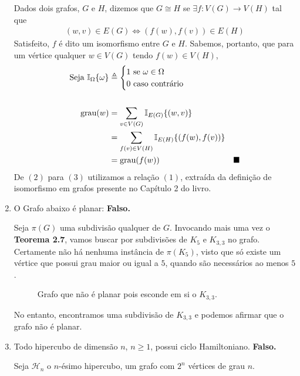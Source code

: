 \documentclass{homework}
\begin{document}
\begin{enumerate}[label=\textbf{\arabic*)}]
	Dados dois grafos, $G$ e $H$, dizemos que $G \cong H$ se $\exists f : V(G) \to V(H)$ tal que
		\begin{align}
			(w, v) \in E(G) \iff (f(w), f(v)) \in E(H)
		\end{align}
	Satisfeito, $f$ é dito um isomorfismo entre $G$ e $H$. Sabemos, portanto, que para um vértice qualquer $w \in V(G)$ tendo $f(w) \in V(H)$,
		\begin{align}
		\text{Seja } \mathbb{I}_{\Omega}\{\omega\} &\triangleq \begin{cases}
		1 \text{ se } \omega \in \Omega\\
		0 \text{ caso contrário}
		\end{cases} \nonumber \\
		~ \nonumber \\
		\text{grau}(w) &= \sum_{v \in V(G)} \mathbb{I}_{E(G)}\{(w, v)\}\\
					   &= \sum_{f(v) \in V(H)} \mathbb{I}_{E(H)}\{(f(w), f(v))\}\\
					   &= \text{grau}(f(w)) & \blacksquare \nonumber
		\end{align}
	De $(2)$ para $(3)$ utilizamos a relação $(1)$, extraída da definição de isomorfismo em grafos presente no Capítulo 2 do livro\cite{jayme:18}.
	
	\item O Grafo abaixo é planar: \textbf{Falso.} \par
	
	Seja $\pi(G)$ uma subdivisão qualquer de $G$. Invocando mais uma vez o \textbf{Teorema 2.7}\cite{jayme:18}, vamos buscar por subdivisões de $K_5$ e $K_{3, 3}$ no grafo. Certamente não há nenhuma instância de $\pi(K_5)$, visto que só existe um vértice que possui grau maior ou igual a $5$, quando são necessários ao menos $5$.
	
	\begin{figure}[H]
		\centering
		
		\caption{Grafo que não é planar pois esconde em si o $K_{3,3}$.}
		\label{fig:1.5.1}
	\end{figure}
	
	No entanto, encontramos uma subdivisão de $K_{3, 3}$ e podemos afirmar que o grafo não é planar.
	
	\item Todo hipercubo de dimensão $n$, $n \ge 1$, possui ciclo Hamiltoniano. \textbf{Falso.}
	
	Seja $\mathscr{H}_n$ o $n$-ésimo hipercubo, um grafo com $2^n$ vértices de grau $n$. \par
	

\end{enumerate}
\end{document}
